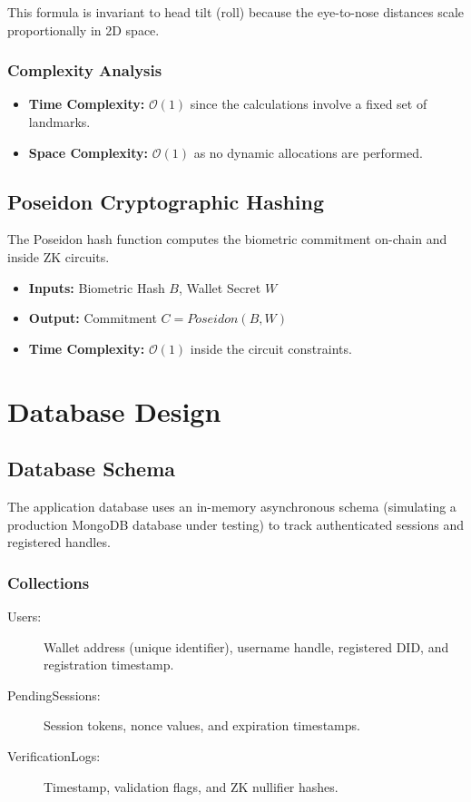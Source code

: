\documentclass[12pt,a4paper,oneside]{report}
\begin{document}
This formula is invariant to head tilt (roll) because the eye-to-nose distances scale proportionally in 2D space.

\subsection{Complexity Analysis}
\begin{itemize}
    \item \textbf{Time Complexity:} $\mathcal{O}(1)$ since the calculations involve a fixed set of landmarks.
    \item \textbf{Space Complexity:} $\mathcal{O}(1)$ as no dynamic allocations are performed.
\end{itemize}

\section{Poseidon Cryptographic Hashing}
The Poseidon hash function computes the biometric commitment on-chain and inside ZK circuits.
\begin{itemize}
    \item \textbf{Inputs:} Biometric Hash $B$, Wallet Secret $W$
    \item \textbf{Output:} Commitment $C = Poseidon(B, W)$
    \item \textbf{Time Complexity:} $\mathcal{O}(1)$ inside the circuit constraints.
\end{itemize}

\newpage

\chapter{Database Design}

\section{Database Schema}
The application database uses an in-memory asynchronous schema (simulating a production MongoDB database under testing) to track authenticated sessions and registered handles.

\subsection{Collections}
\begin{description}
    \item[Users:] Wallet address (unique identifier), username handle, registered DID, and registration timestamp.
    \item[PendingSessions:] Session tokens, nonce values, and expiration timestamps.
    \item[VerificationLogs:] Timestamp, validation flags, and ZK nullifier hashes.
\end{description}
\end{document}
